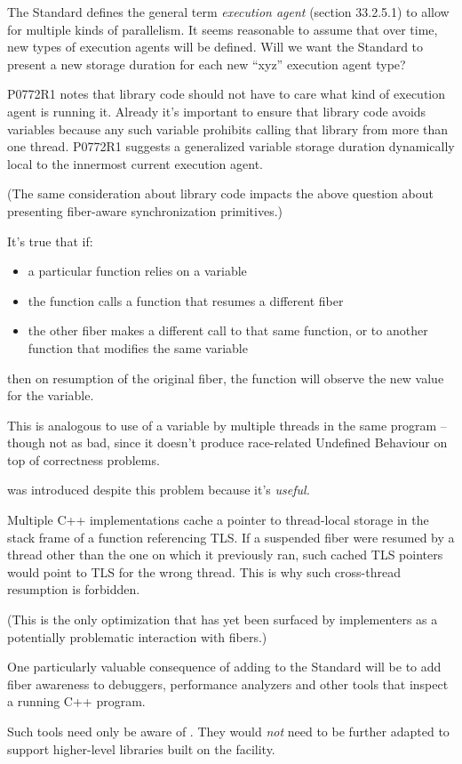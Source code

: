 The Standard defines the general term \emph{execution agent} (section
33.2.5.1) to allow for multiple kinds of parallelism. It seems reasonable to
assume that over time, new types of execution agents will be defined. Will we
want the Standard to present a new  storage duration for each
new ``xyz'' execution agent type?

P0772R1\cite{P0772R1} notes that library code should not have to care what
kind of execution agent is running it. Already it's important to ensure that
library code avoids  variables because any such variable prohibits
calling that library from more than one thread. P0772R1 suggests a generalized
variable storage duration dynamically local to the innermost current execution
agent.

(The same consideration about library code impacts the above question about
presenting fiber-aware synchronization primitives.)

It's true that if:

\begin{itemize}
    \item a particular function relies on a  variable
    \item the function calls a function that resumes a different fiber
    \item the other fiber makes a different call to that same function, or to
          another function that modifies the same  variable
\end{itemize}

then on resumption of the original fiber, the function will observe the new
value for the  variable.

This is analogous to use of a  variable by multiple threads in the
same program -- though not as bad, since it doesn't produce race-related
Undefined Behaviour on top of correctness problems.

 was introduced despite this problem because it's \emph{useful.}

Multiple C++ implementations cache a pointer to thread-local storage in the
stack frame of a function referencing TLS. If a suspended fiber were resumed
by a thread other than the one on which it previously ran, such cached TLS
pointers would point to TLS for the wrong thread. This is why such
cross-thread resumption is forbidden.

(This is the only optimization that has yet been surfaced by implementers as a
potentially problematic interaction with fibers.)

 One particularly valuable consequence of adding \fiber to
the Standard will be to add fiber awareness to debuggers, performance
analyzers and other tools that inspect a running C++ program.

Such tools need only be aware of \fiber. They would \emph{not} need to be
further adapted to support higher-level libraries built on
the  facility.

\newpage
